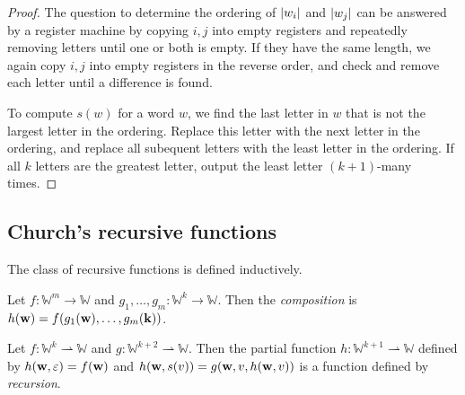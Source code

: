 \begin{proof}
	The question to determine the ordering of \( \abs{w_i} \) and \( \abs{w_j} \) can be answered by a register machine by copying \( i, j \) into empty registers and repeatedly removing letters until one or both is empty.
	If they have the same length, we again copy \( i, j \) into empty registers in the reverse order, and check and remove each letter until a difference is found.

	To compute \( s(w) \) for a word \( w \), we find the last letter in \( w \) that is not the largest letter in the ordering.
	Replace this letter with the next letter in the ordering, and replace all subequent letters with the least letter in the ordering.
	If all \( k \) letters are the greatest letter, output the least letter \( (k + 1) \)-many times.
\end{proof}

\subsection{Church's recursive functions}
The class of recursive functions is defined inductively.

Let \( f \colon \mathbb W^m \to \mathbb W \) and \( g_1, \dots, g_m \colon \mathbb W^k \to \mathbb W \).
Then the \emph{composition} is \( h(\vb w) = f(g_1(\vb w), \dots, g_m(\vb k)) \).

Let \( f \colon \mathbb W^k \rightharpoonup \mathbb W \) and \( g \colon \mathbb W^{k+2} \rightharpoonup \mathbb W \).
Then the partial function \( h \colon \mathbb W^{k+1} \rightharpoonup \mathbb W \) defined by \( h(\vb w, \varepsilon) = f(\vb w) \) and \( h(\vb w, s(v)) = g(\vb w, v, h(\vb w, v)) \) is a function defined by \emph{recursion}.

